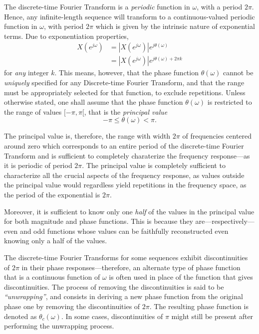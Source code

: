 \documentclass[\documentfontsize, twocolumn]{\classname}
\begin{document}
The discrete-time Fourier Transform is a \emph{periodic} function in $\omega$,
with a period $2\pi$. Hence, any infinite-length sequence will transform to a
continuous-valued periodic function in $\omega$, with period $2\pi$ which is
given by the intrinsic nature of exponential terms.
Due to exponentiation properties,
\begin{align*}
    X(e^{j\omega}) &= \left|X(e^{j\omega})\right|e^{j\theta(\omega)}\\
                   &= \left|X(e^{j\omega})\right|e^{j\theta(\omega) + 2\pi k}
\end{align*}
for \emph{any} integer $k$. This means, however, that the phase function $\theta(\omega)$ cannot be \emph{uniquely} specified for any Discrete-time Fourier Transform, and that the range must be appropriately selected for that function, to exclude repetitions. Unless otherwise stated, one shall assume that the phase function $\theta(\omega)$ is restricted to the range of values $[-\pi,\pi[$, that is the \emph{principal value}
\begin{equation}\label{eqn:phasePrincipalValue}
    -\pi \leq \theta(\omega) < \pi.
\end{equation}

The principal value is, therefore, the range with width $2\pi$ of frequencies
centered around zero which corresponds to an entire period of the discrete-time
Fourier Transform and is sufficient to completely charaterize the frequency
response---as it is periodic of period $2\pi$.
The principal value is completely sufficient to characterize all the crucial aspects of the frequency response, as values outside the principal value would regardless yield repetitions in the frequency space, as the period of the exponential is $2\pi$.

Moreover, it is sufficient to know only one \emph{half} of the values in the principal value for both magnitude and phase functions. This is because they are---respectively---even and odd functions whose values can be faithfully reconstructed even knowing only a half of the values.

The discrete-time Fourier Transforms for some sequences exhibit discontinuities of $2\pi$ in their phase res\-pon\-ses---the\-re\-fo\-re, an alternate type of phase function that is a continuous function of $\omega$ is often used in place of the function that gives discontinuities. The process of removing the discontinuities is said to be \emph{``unwrapping''}, and consists in deriving a new phase function from the original phase one by removing the discontinuities of $2\pi$. The resulting phase function is denoted as $\theta_c(\omega)$. In some cases, discontinuities of $\pi$ might still be present after performing the unwrapping process.
\end{document}
